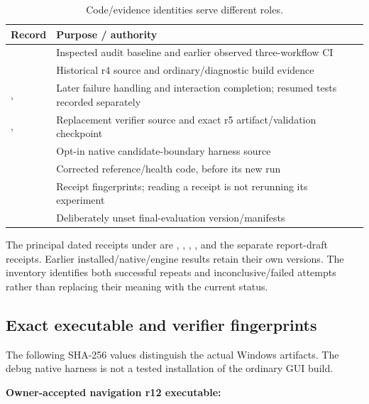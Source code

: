 \begin{table}[htbp]
\small\begin{tabularx}{\linewidth}{@{}>{\raggedright\arraybackslash}p{.29\linewidth}Y@{}}
\toprule
Record & Purpose / authority\\
\midrule
{} & Inspected audit baseline and earlier observed three-workflow CI\\
 & Historical r4 source and ordinary/diagnostic build evidence\\
,  & Later failure handling and interaction completion; resumed tests recorded separately\\
,  & Replacement verifier source and exact r5 artifact/validation checkpoint\\
 & Opt-in native candidate-boundary harness source\\
 & Corrected reference/health code, before its new run\\
 & Receipt fingerprints; reading a receipt is not rerunning its experiment\\
 & Deliberately unset final-evaluation version/manifests\\
\bottomrule
\end{tabularx}
\caption{Code/evidence identities serve different roles.}
\label{tab:artifact-map}
\end{table}

The principal dated receipts under  are
,
,
,
, and the separate report-draft
receipts. Earlier installed/native/engine results retain their own versions.
The inventory identifies both successful repeats and inconclusive/failed
attempts rather than replacing their meaning with the current status.

\subsection{Exact executable and verifier fingerprints}
The following SHA-256 values distinguish the actual Windows artifacts. The
debug native harness is not a tested installation of the ordinary GUI build.

\textbf{Owner-accepted navigation r12 executable:}\\

